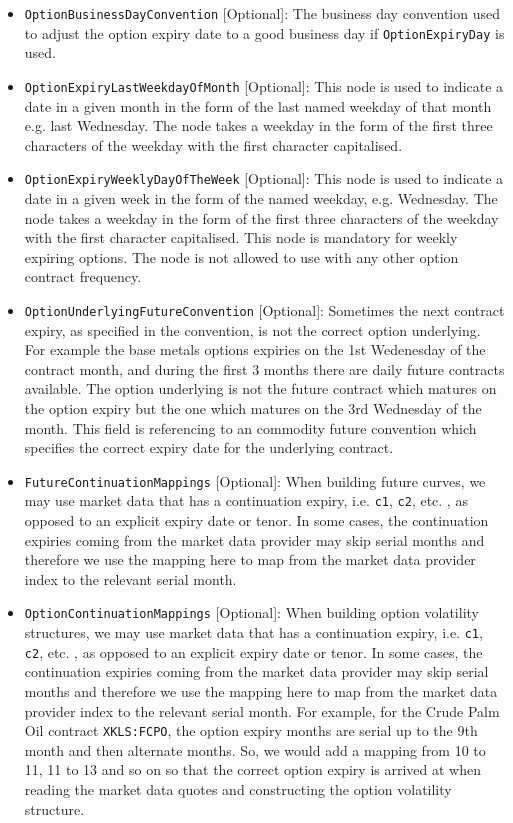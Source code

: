 \begin{itemize}
\item \lstinline!OptionBusinessDayConvention! [Optional]: The business day convention used to adjust the option expiry date to a good business day if \lstinline!OptionExpiryDay! is used.
\item \lstinline!OptionExpiryLastWeekdayOfMonth! [Optional]: This node is used to indicate a date in a given month in the form of the last named weekday of that month e.g. last Wednesday. The node takes a weekday in the form of the first three characters of the weekday with the first character capitalised.
\item \lstinline!OptionExpiryWeeklyDayOfTheWeek! [Optional]: This node is used to indicate a date in a given week in the form of the named weekday, e.g. Wednesday. The node takes a weekday in the form of the first three characters of the weekday with the first character capitalised. This node is mandatory for weekly expiring options. The node is not allowed to use with any other option contract frequency.
\item \lstinline!OptionUnderlyingFutureConvention! [Optional]: Sometimes the next contract expiry, as specified in the convention, is not the correct option underlying. For example the base metals options expiries on the 1st Wedenesday of the contract month, and during the first 3 months there are daily future contracts available. The option underlying is not the future contract which matures on the option expiry but the one which matures on the 3rd Wednesday of the month. This field is referencing to an commodity future convention which specifies the correct expiry date for the underlying contract.
\item \lstinline!FutureContinuationMappings! [Optional]: When building future curves, we may use market data that has a continuation expiry, i.e. \lstinline!c1!, \lstinline!c2!, etc. , as opposed to an explicit expiry date or tenor. In some cases, the continuation expiries coming from the market data provider may skip serial months and therefore we use the mapping here to map from the market data provider index to the relevant serial month.
\item \lstinline!OptionContinuationMappings! [Optional]: When building option volatility structures, we may use market data that has a continuation expiry, i.e. \lstinline!c1!, \lstinline!c2!, etc. , as opposed to an explicit expiry date or tenor. In some cases, the continuation expiries coming from the market data provider may skip serial months and therefore we use the mapping here to map from the market data provider index to the relevant serial month. For example, for the Crude Palm Oil contract \lstinline!XKLS:FCPO!, the option expiry months are serial up to the 9th month and then alternate months. So, we would add a mapping from 10 to 11, 11 to 13 and so on so that the correct option expiry is arrived at when reading the market data quotes and constructing the option volatility structure.

\end{itemize}
